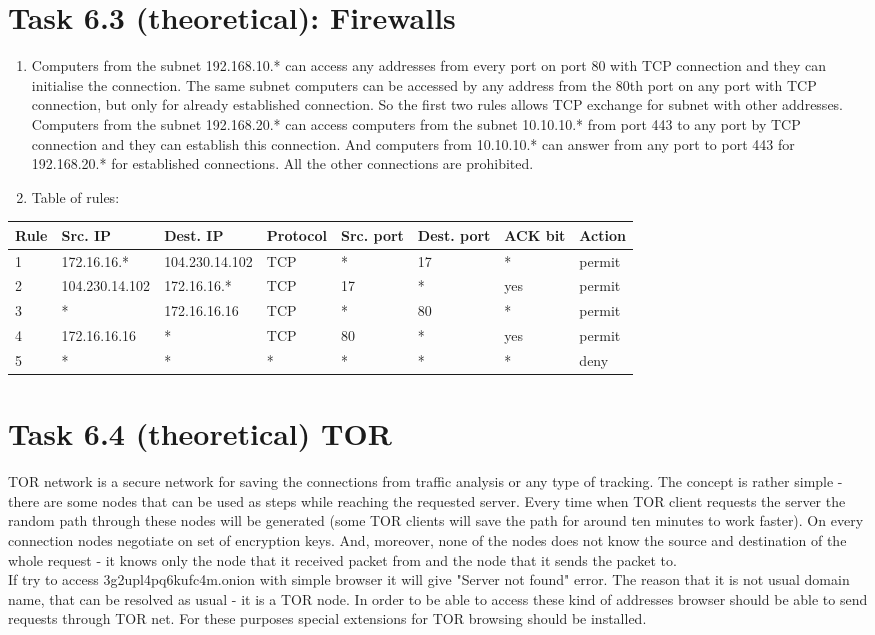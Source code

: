 \documentclass{article}
\begin{document}
\section*{Task 6.3 (theoretical): Firewalls}
\begin{enumerate}
\item Computers from the subnet 192.168.10.* can access any addresses from every port on port 80 with TCP connection and they can initialise the connection. The same subnet computers can be accessed by any address from the 80th port on any port with TCP connection, but only for already established connection. So the first two rules allows TCP exchange for subnet with other addresses. Computers from the subnet 192.168.20.* can access computers from the subnet 10.10.10.* from port 443 to any port by TCP connection and they can establish this connection. And computers from 10.10.10.* can answer from any port to port 443 for 192.168.20.* for established connections. All the other connections are prohibited.
\item Table of rules:
\end{enumerate}
\begin{tabular}{ l | l | l | l | l | l | l | l }
  Rule & Src. IP & Dest. IP & Protocol & Src. port & Dest. port & ACK bit & Action \\
  \hline			
  1 & 172.16.16.* & 104.230.14.102 & TCP & * & 17 & * & permit  \\
  2 & 104.230.14.102 & 172.16.16.* & TCP & 17 & * & yes & permit \\
  3 & * & 172.16.16.16 & TCP & * & 80 & * & permit \\
  4 & 172.16.16.16 & * & TCP & 80 & * & yes & permit \\
  5 & * & * & * & * & * & * & deny \\
  \hline  
\end{tabular}

\section *{Task 6.4 (theoretical) TOR}
TOR network is a secure network for saving the connections from traffic analysis or any type of tracking. The concept is rather simple - there are some nodes that can be used as steps while reaching the requested server. Every time when TOR client requests the server the random path through these nodes will be generated (some TOR clients will save the path for around ten minutes to work faster). On every connection nodes negotiate on set of encryption keys. And, moreover, none of the nodes does not know the source and destination of the whole request - it knows only the node that it received packet from and the node that it sends the packet to. \cite{tor}
\\
If try to access 3g2upl4pq6kufc4m.onion with simple browser it will give "Server not found" error. The reason that it is not usual domain name, that can be resolved as usual - it is a TOR node. In order to be able to access these kind of addresses browser should be able to send requests through TOR net. For these purposes special extensions for TOR browsing should be installed.
\end{document}
